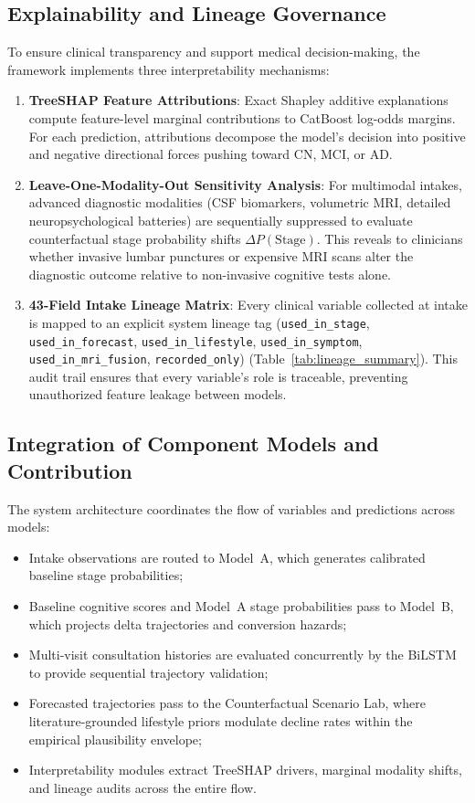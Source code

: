 \subsection{Explainability and Lineage Governance}
To ensure clinical transparency and support medical decision-making, the framework implements three interpretability mechanisms:
\begin{enumerate}
    \item \textbf{TreeSHAP Feature Attributions}: Exact Shapley additive explanations~\cite{lundberg2017shap} compute feature-level marginal contributions to CatBoost log-odds margins. For each prediction, attributions decompose the model's decision into positive and negative directional forces pushing toward CN, MCI, or AD.
    \item \textbf{Leave-One-Modality-Out Sensitivity Analysis}: For multimodal intakes, advanced diagnostic modalities (CSF biomarkers, volumetric MRI, detailed neuropsychological batteries) are sequentially suppressed to evaluate counterfactual stage probability shifts $\Delta P(\text{Stage})$. This reveals to clinicians whether invasive lumbar punctures or expensive MRI scans alter the diagnostic outcome relative to non-invasive cognitive tests alone.
    \item \textbf{43-Field Intake Lineage Matrix}: Every clinical variable collected at intake is mapped to an explicit system lineage tag (\texttt{used\_in\_stage}, \texttt{used\_in\_forecast}, \texttt{used\_in\_lifestyle}, \texttt{used\_in\_symptom}, \texttt{used\_in\_mri\_fusion}, \texttt{recorded\_only}) (Table~\ref{tab:lineage_summary}). This audit trail ensures that every variable's role is traceable, preventing unauthorized feature leakage between models.
\end{enumerate}

\subsection{Integration of Component Models and Contribution}
The system architecture coordinates the flow of variables and predictions across models:
\begin{itemize}
    \item Intake observations are routed to Model~A, which generates calibrated baseline stage probabilities;
    \item Baseline cognitive scores and Model~A stage probabilities pass to Model~B, which projects delta trajectories and conversion hazards;
    \item Multi-visit consultation histories are evaluated concurrently by the BiLSTM to provide sequential trajectory validation;
    \item Forecasted trajectories pass to the Counterfactual Scenario Lab, where literature-grounded lifestyle priors modulate decline rates within the empirical plausibility envelope;
    \item Interpretability modules extract TreeSHAP drivers, marginal modality shifts, and lineage audits across the entire flow.
\end{itemize}

